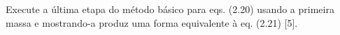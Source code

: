 Execute a última etapa do método básico para eqs. (2.20) usando a primeira massa e mostrando-a produz uma forma equivalente à eq. (2.21) [5].
